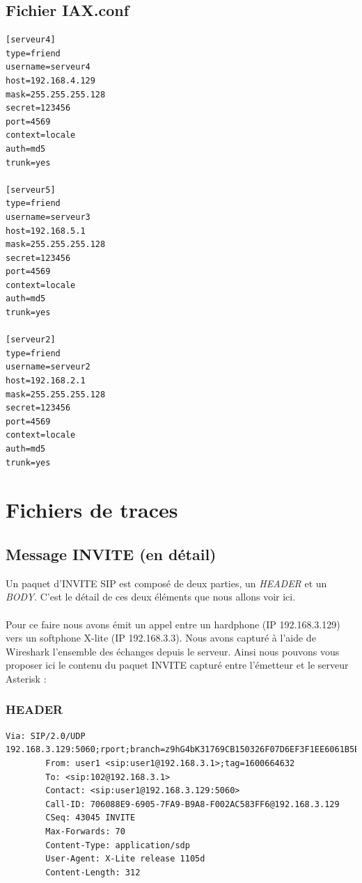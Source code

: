 \documentclass[12pt,a4paper,notitlepage]{article}
\begin{document}
\subsection{Fichier IAX.conf}

\begin{lstlisting}[title=Fichier IAX.conf]
[serveur4]
type=friend
username=serveur4
host=192.168.4.129
mask=255.255.255.128
secret=123456
port=4569
context=locale
auth=md5
trunk=yes

[serveur5]
type=friend
username=serveur3
host=192.168.5.1
mask=255.255.255.128
secret=123456
port=4569
context=locale
auth=md5
trunk=yes

[serveur2]
type=friend
username=serveur2
host=192.168.2.1
mask=255.255.255.128
secret=123456
port=4569
context=locale
auth=md5
trunk=yes
\end{lstlisting}


\section{Fichiers de traces}
\subsection{Message INVITE (en détail)}
Un paquet d'INVITE SIP est composé de deux parties, un \textit{HEADER} et un  \textit{BODY}. C'est le détail de ces deux éléments que nous allons voir ici. 

\paragraph{}Pour ce faire nous avons émit un appel entre un hardphone (IP 192.168.3.129) vers un softphone X-lite (IP 192.168.3.3). Nous avons capturé à l'aide de Wireshark l'ensemble des échanges depuis le serveur. Ainsi nous pouvons vous proposer ici le contenu du paquet INVITE capturé entre l'émetteur et le serveur Asterisk :
\subsubsection{HEADER}
\begin{lstlisting}[title=Contenu du HEADER d'un paquet INVITE de SIP]
 Via: SIP/2.0/UDP 192.168.3.129:5060;rport;branch=z9hG4bK31769CB150326F07D6EF3F1EE6061B5B
        From: user1 <sip:user1@192.168.3.1>;tag=1600664632
        To: <sip:102@192.168.3.1>
        Contact: <sip:user1@192.168.3.129:5060>
        Call-ID: 706088E9-6905-7FA9-B9A8-F002AC583FF6@192.168.3.129
        CSeq: 43045 INVITE
        Max-Forwards: 70
        Content-Type: application/sdp
        User-Agent: X-Lite release 1105d
        Content-Length: 312
\end{lstlisting}
\end{document}
